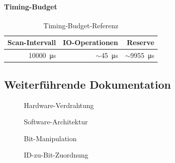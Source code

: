 \paragraph{Timing-Budget}

\begin{table}[htbp]
\centering
\begin{tabular}{@{}rrr@{}}
\toprule
\textbf{Scan-Intervall} & \textbf{IO-Operationen} & \textbf{Reserve} \\
\midrule
\SI{10000}{\micro\second} & $\sim$\SI{45}{\micro\second} & $\sim$\SI{9955}{\micro\second} \\
\bottomrule
\end{tabular}
\caption{Timing-Budget-Referenz}
\label{tab:timing-referenz}
\end{table}

\subsection{Weiterführende Dokumentation}

\begin{description}
\item[] Hardware-Verdrahtung
\item[] Software-Architektur
\item[] Bit-Manipulation
\item[] ID-zu-Bit-Zuordnung
\end{description}
